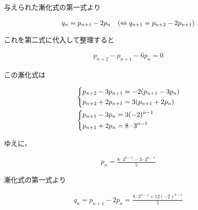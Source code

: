 \documentclass[a4paper]{ltjsarticle}
\newcommand{\flan}[1]{\begin{fleqn}[20pt]\begin{align*} #1 \end{align*}\end{fleqn}}
\begin{document}
\begin{ans*}
\begin{enumerate}[label=(\arabic*)]
\begin{other*}
      与えられた漸化式の第一式より
      \flan{
          q_n = p_{n+1} - 2p_{n}\quad(\eqa q_{n+1} = p_{n+2} - 2p_{n+1})
      }
      これを第二式に代入して整理すると
      \flan{
          p_{n+2} - p_{n+1} - 6p_{n} = 0
      }
      この漸化式は
      \flan{
          &\begin{dcases*}
            p_{n+2} - 3p_{n+1} = -2(p_{n+1} - 3p_{n}) \\
            p_{n+2} + 2p_{n+1} =  3(p_{n+1} + 2p_{n})
          \end{dcases*} \\
          &\begin{dcases*}
            p_{n+1} - 3p_{n} = 3(-2)^{n-1} \\
            p_{n+1} + 2p_{n} = 8\cdot3^{n-1}
          \end{dcases*} \\
      }
      ゆえに、
      \flan{
          p_n = \frac{8\cdot 3^{n-1} - 3\cdot 2^{n-1}}{5}
      }
      漸化式の第一式より
      \flan{
          q_n = p_{n+1} - 2p_{n} = \frac{8\cdot 3^{n-1} + 12(-2)^{n-1}}{5}
      }
    \end{other*}
\end{enumerate}
\end{ans*}
\end{document}
